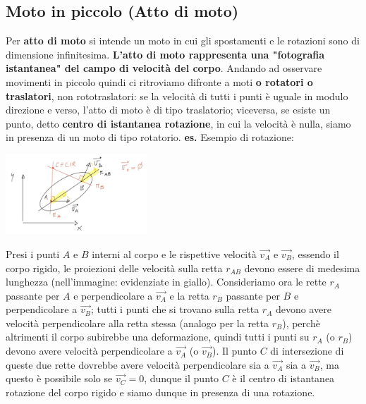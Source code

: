 \subsection{Moto in piccolo (Atto di moto)}
Per \textbf{atto di moto} si intende un moto in cui gli spostamenti e le rotazioni sono di dimensione infinitesima. \textbf{L'atto di moto rappresenta una "fotografia istantanea" del campo di velocità del corpo}.\newline
\newline
Andando ad osservare movimenti in piccolo quindi ci ritroviamo difronte a moti \textbf{o rotatori o traslatori}, non rototraslatori: se la velocità di tutti i punti è uguale in modulo direzione e verso, l'atto di moto è di tipo traslatorio; viceversa, se esiste un punto, detto \textbf{centro di istantanea rotazione}, in cui la velocità è nulla, siamo in presenza di un moto di tipo rotatorio.\newline
\newline
\textbf{es.} Esempio di rotazione:
\begin{center}
    \includegraphics[height=3cm]{../lezione2/img6.JPG}
\end{center}
Presi i punti $A$ e $B$ interni al corpo e le rispettive velocità $\vec{v_A}$ e $\vec{v_B}$, essendo il corpo rigido, le proiezioni delle velocità sulla retta $r_{AB}$ devono essere di medesima lunghezza (nell'immagine: evidenziate in giallo).\newline
Consideriamo ora le rette $r_A$ passante per $A$ e perpendicolare a $\vec{v_A}$ e la retta $r_B$ passante per $B$ e perpendicolare a $\vec{v_B}$; tutti i punti che si trovano sulla retta $r_A$ devono avere velocità perpendicolare alla retta stessa (analogo per la retta $r_B$), perchè altrimenti il corpo subirebbe una deformazione, quindi tutti i punti su $r_A$ (o $r_B$) devono avere velocità perpendicolare a $\vec{v_A}$ (o $\vec{v_B}$). Il punto $C$ di intersezione di queste due rette dovrebbe avere velocità perpendicolare sia a $\vec{v_A}$ sia a $\vec{v_B}$, ma questo è possibile solo se $\vec{v_C} = 0$, dunque il punto $C$ è il centro di istantanea rotazione del corpo rigido e siamo dunque in presenza di una rotazione.\newline
